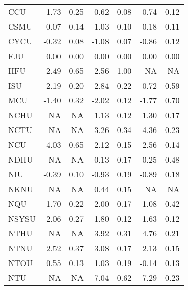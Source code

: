 \begin{longtable}[t]{lrrrrrr}
\hspace{1em}CCU & 1.73 & 0.25 & 0.62 & 0.08 & 0.74 & 0.12\\
\hspace{1em}CSMU & -0.07 & 0.14 & -1.03 & 0.10 & -0.18 & 0.11\\
\hspace{1em}CYCU & -0.32 & 0.08 & -1.08 & 0.07 & -0.86 & 0.12\\
\hspace{1em}FJU & 0.00 & 0.00 & 0.00 & 0.00 & 0.00 & 0.00\\
\hspace{1em}HFU & -2.49 & 0.65 & -2.56 & 1.00 & NA & NA\\
\hspace{1em}ISU & -2.19 & 0.20 & -2.84 & 0.22 & -0.72 & 0.59\\
\hspace{1em}MCU & -1.40 & 0.32 & -2.02 & 0.12 & -1.77 & 0.70\\
\hspace{1em}NCHU & NA & NA & 1.13 & 0.12 & 1.30 & 0.17\\
\hspace{1em}NCTU & NA & NA & 3.26 & 0.34 & 4.36 & 0.23\\
\hspace{1em}NCU & 4.03 & 0.65 & 2.12 & 0.15 & 2.56 & 0.14\\
\hspace{1em}NDHU & NA & NA & 0.13 & 0.17 & -0.25 & 0.48\\
\hspace{1em}NIU & -0.39 & 0.10 & -0.93 & 0.19 & -0.89 & 0.18\\
\hspace{1em}NKNU & NA & NA & 0.44 & 0.15 & NA & NA\\
\hspace{1em}NQU & -1.70 & 0.22 & -2.00 & 0.17 & -1.08 & 0.42\\
\hspace{1em}NSYSU & 2.06 & 0.27 & 1.80 & 0.12 & 1.63 & 0.12\\
\hspace{1em}NTHU & NA & NA & 3.92 & 0.31 & 4.76 & 0.21\\
\hspace{1em}NTNU & 2.52 & 0.37 & 3.08 & 0.17 & 2.13 & 0.15\\
\hspace{1em}NTOU & 0.55 & 0.13 & 1.03 & 0.19 & -0.14 & 0.13\\
\hspace{1em}NTU & NA & NA & 7.04 & 0.62 & 7.29 & 0.23\\

\end{longtable}
